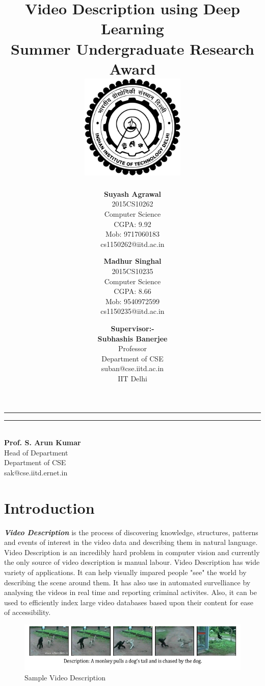 \documentclass{article}
\title{\vspace*{\fill} \textbf{Video Description using Deep Learning}
	  \\ {\large \textbf{Summer Undergraduate Research Award}}
	  \\  \vspace{3mm} \includegraphics[width=5cm]{logo.png}}
\author{
	\textbf{Suyash Agrawal}\\ 
	2015CS10262\\
	Computer Science\\
	CGPA: 9.92 \\
	Mob: 9717060183\\
	cs1150262@iitd.ac.in
	\and
	\textbf{Madhur Singhal}\\ 
	2015CS10235\\
	Computer Science\\
	CGPA: 8.66\\
	Mob: 9540972599\\
	cs1150235@iitd.ac.in
}
\date{\textbf{Supervisor:-} \\ \textbf{Subhashis Banerjee} \\ Professor \\ Department of CSE \\ suban@cse.iitd.ac.in\\ IIT Delhi\\
\vspace*{\fill}}
\makeatletter
\newcommand{\namesigdate}[2][5cm]{%
  \begin{tabular}{@{}p{#1}@{}}
    #2 \\[0.4\normalbaselineskip] \hrule \\[0pt]
    {\small } \\[2\normalbaselineskip] 
  \end{tabular}
}
\makeatother
\begin{document}
	\maketitle


\begin{center}
\noindent\rule{3.2cm}{0.4pt} 
\end{center}

\begin{flushright}
\noindent\rule{3.2cm}{0.4pt} 
\\ \textbf{Prof. S. Arun Kumar}
\\ Head of Department
\\ Department of CSE
\\ sak@cse.iitd.ernet.in
\end{flushright}


	\newpage
	
	\section{Introduction}
		\textit{\textbf{Video Description}} is the process of discovering knowledge, structures, patterns and events of interest in the video data and describing them in natural language. Video Description is an incredibly hard problem in computer vision and currently the only source of video description is manual labour. 
		\newline
		Video Description has wide variety of applications. It can help visually impared people "see" the world by describing the scene around them. It has also use in automated survelliance by analysing the videos in real time and reporting criminal activites. Also, it can be used to efficiently index large video databases based upon their content for ease of accessibility.

		\begin{figure}[ht!]
		\centering
		\includegraphics[width=12.5cm]{description.png}
		\caption{Sample Video Description\label{fig0}}
		\end{figure}		
		
\end{document}
